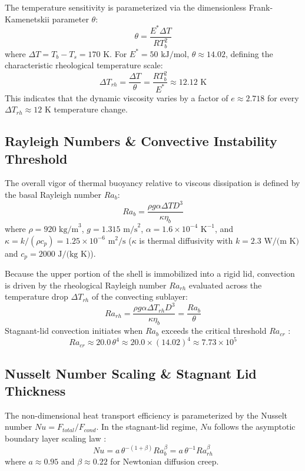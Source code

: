 \documentclass[11pt,a4paper]{article}
\begin{document}
The temperature sensitivity is parameterized via the dimensionless Frank-Kamenetskii parameter $\theta$:
\begin{equation}
\theta = \frac{E^* \Delta T}{R T_b^2}
\end{equation}
where $\Delta T = T_b - T_s = 170\text{ K}$. For $E^* = 50\text{ kJ/mol}$, $\theta \approx 14.02$, defining the characteristic rheological temperature scale:
\begin{equation}
\Delta T_{rh} = \frac{\Delta T}{\theta} = \frac{R T_b^2}{E^*} \approx 12.12\text{ K}
\end{equation}
This indicates that the dynamic viscosity varies by a factor of $e \approx 2.718$ for every $\Delta T_{rh} \approx 12\text{ K}$ temperature change.

\subsection{Rayleigh Numbers \& Convective Instability Threshold}
The overall vigor of thermal buoyancy relative to viscous dissipation is defined by the basal Rayleigh number $Ra_b$:
\begin{equation}
Ra_b = \frac{\rho g \alpha \Delta T D^3}{\kappa \eta_b}
\end{equation}
where $\rho = 920\text{ kg/m}^3$, $g = 1.315\text{ m/s}^2$, $\alpha = 1.6 \times 10^{-4}\text{ K}^{-1}$, and $\kappa = k / (\rho c_p) = 1.25 \times 10^{-6}\text{ m}^2/\text{s}$ ($\kappa$ is thermal diffusivity with $k = 2.3\text{ W/(m K)}$ and $c_p = 2000\text{ J/(kg K)}$).

Because the upper portion of the shell is immobilized into a rigid lid, convection is driven by the rheological Rayleigh number $Ra_{rh}$ evaluated across the temperature drop $\Delta T_{rh}$ of the convecting sublayer:
\begin{equation}
Ra_{rh} = \frac{\rho g \alpha \Delta T_{rh} D^3}{\kappa \eta_b} = \frac{Ra_b}{\theta}
\end{equation}
Stagnant-lid convection initiates when $Ra_b$ exceeds the critical threshold $Ra_{cr}$ \cite{solomatov2000}:
\begin{equation}
Ra_{cr} \approx 20.0\,\theta^4 \approx 20.0 \times (14.02)^4 \approx 7.73 \times 10^5
\end{equation}

\subsection{Nusselt Number Scaling \& Stagnant Lid Thickness}
The non-dimensional heat transport efficiency is parameterized by the Nusselt number $Nu = F_{total} / F_{cond}$. In the stagnant-lid regime, $Nu$ follows the asymptotic boundary layer scaling law \cite{showman2004,solomatov2000}:
\begin{equation}
Nu = a\,\theta^{-(1+\beta)} Ra_b^\beta = a\,\theta^{-1} Ra_{rh}^\beta
\end{equation}
where $a \approx 0.95$ and $\beta \approx 0.22$ for Newtonian diffusion creep.
\end{document}
